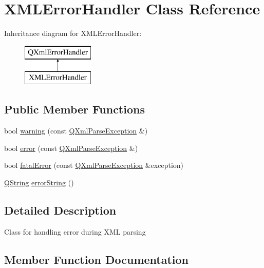 \hypertarget{class_x_m_l_error_handler}{}\section{X\+M\+L\+Error\+Handler Class Reference}
\label{class_x_m_l_error_handler}
Inheritance diagram for X\+M\+L\+Error\+Handler\+:\begin{figure}[H]
\begin{center}
\leavevmode
\includegraphics[height=2.000000cm]{class_x_m_l_error_handler}
\end{center}
\end{figure}
\subsection*{Public Member Functions}
\begin{DoxyCompactItemize}
\item 
bool \mbox{\hyperlink{class_x_m_l_error_handler_ae24e6692734e1075c74d0417c1678548}{warning}} (const \mbox{\hyperlink{class_q_xml_parse_exception}{Q\+Xml\+Parse\+Exception}} \&)
\item 
bool \mbox{\hyperlink{class_x_m_l_error_handler_a79615a75d1d5e5bf0c3a1c659a1956b9}{error}} (const \mbox{\hyperlink{class_q_xml_parse_exception}{Q\+Xml\+Parse\+Exception}} \&)
\item 
bool \mbox{\hyperlink{class_x_m_l_error_handler_a7e3ad0aecf457ca44b284c71c1ab28bc}{fatal\+Error}} (const \mbox{\hyperlink{class_q_xml_parse_exception}{Q\+Xml\+Parse\+Exception}} \&exception)
\item 
\mbox{\hyperlink{class_q_string}{Q\+String}} \mbox{\hyperlink{class_x_m_l_error_handler_ac8884161fa6aa0624f42ec57b04a66bb}{error\+String}} ()
\end{DoxyCompactItemize}


\subsection{Detailed Description}
Class for handling error during X\+ML parsing 

\subsection{Member Function Documentation}
\mbox{\label{class_x_m_l_error_handler_a79615a75d1d5e5bf0c3a1c659a1956b9}} 
